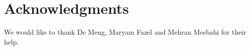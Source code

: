 \section{Acknowledgments}
We would like to thank De Meng, Maryam Fazel and Mehran Mesbahi for their help.